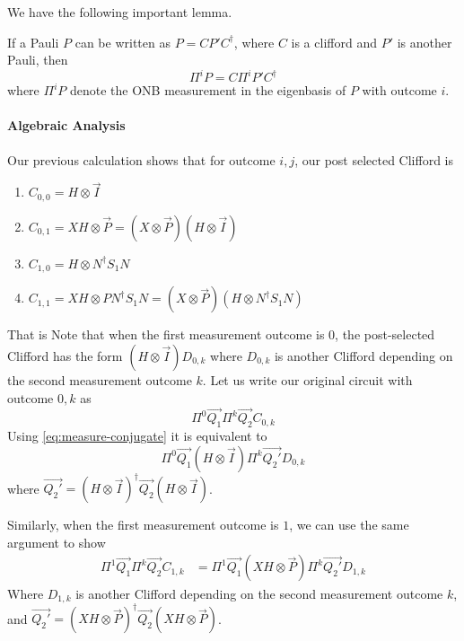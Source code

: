 We have the following important lemma.

\begin{lemma}\label{lemma:measure-conjugate}
If a Pauli $P$ can be written as  $P = C P' C^\dagger$, where $C$ is a clifford and $P'$ is another Pauli, then 
\begin{equation}\label{eq:measure-conjugate}
	\Pi^{i} P = C \Pi^{i} P' C^\dagger
\end{equation}
where $\Pi^{i} P$ denote the ONB measurement in the eigenbasis of $P$ with outcome $i$.
\end{lemma}

\paragraph{Algebraic Analysis}

Our previous calculation shows that for outcome $i, j$, our post selected Clifford is 
\begin{enumerate}
	\item $C_{0, 0} = H \otimes \vec{I}$
	\item $C_{0, 1} = X H \otimes \vec{P} =  (X\otimes \vec{P}) (H \otimes \vec{I})$  
	\item $C_{1, 0} = H \otimes N^{\dagger} S_1 N $
	\item $C_{1, 1} = X H \otimes P N^{\dagger} S_1 N  =  ( X \otimes \vec{P}) (H \otimes N^\dagger S_1 N)$ 
\end{enumerate}

That is
Note that when the first measurement outcome is $0$, the post-selected Clifford has the form $(H\otimes \vec{I}) D_{0,k}$ where $D_{0, k}$ is another Clifford depending on the second measurement outcome $k$.
Let us write our original circuit with outcome $0, k$ as
$$
\Pi^0 \vec{Q_1} \Pi^k\vec{Q_2} C_{0, k}
$$
Using \eqref{eq:measure-conjugate} it is equivalent to
$$
\Pi^0 \vec{Q_1} (H \otimes \vec{I}) \Pi^k\vec{Q_2'} D_{0, k}
$$
where $\vec{Q_2'} = (H\otimes \vec{I})^\dagger \vec{Q_2} (H\otimes \vec{I})$.

Similarly, when the first measurement outcome is $1$, we can use the same argument to show
\begin{align*}
	\Pi^1 \vec{Q_1} \Pi^k\vec{Q_2} C_{1, k}
	&= \Pi^1 \vec{Q_1} (X H \otimes \vec{P}) \Pi^k\vec{Q_2'} D_{1, k} 
\end{align*}
Where $D_{1, k}$ is another Clifford depending on the second measurement outcome $k$, and $\vec{Q_2'} = (X H \otimes \vec{P})^\dagger \vec{Q_2} (X H \otimes \vec{P})$.

